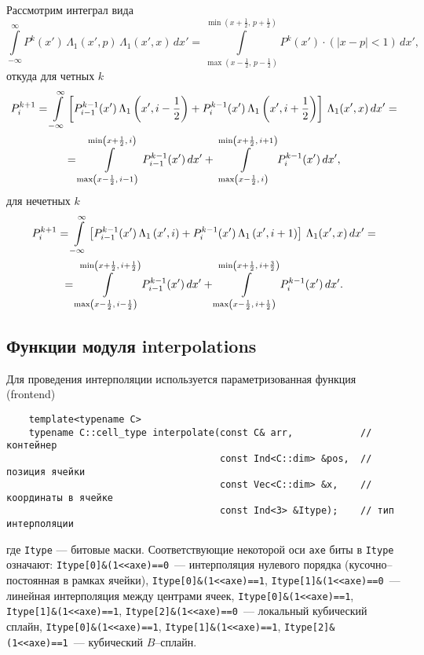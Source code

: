 Рассмотрим интеграл вида
$$
\int\limits_{-\infty}^{\infty} P^k(x')\,\Lambda_1(x', p)\,\Lambda_1(x', x)\, dx' =
\int\limits_{\max\left(x-\frac12,\,p-\frac12\right)}^{\min\left(x+\frac12,\,p+\frac12\right)} P^k(x')\cdot(|x-p|<1)\, dx', 
$$
откуда для четных $k$
\begin{multline}
  P^{k+1}_i = \int\limits_{-\infty}^{\infty} \left[
    P^{k-1}_{i-1}(x')\,\Lambda_1\left(x', i-\frac12\right) + P^{k-1}_i(x')\,\Lambda_1\left(x', i+\frac12\right)
    \right]\,\Lambda_1(x', x)\, dx' =\\=
  \int\limits_{\max\left(x-\frac12,\,i-1\right)}^{\min\left(x+\frac12,\,i\right)} P^{k-1}_{i-1}(x') \, dx' +
  \int\limits_{\max\left(x-\frac12,\,i\right)}^{\min\left(x+\frac12,\,i+1\right)} P^{k-1}_i(x') \, dx', 
  \notag
\end{multline}
для нечетных $k$
\begin{multline}
  P^{k+1}_i = \int\limits_{-\infty}^{\infty} \left[
    P^{k-1}_{i-1}(x')\,\Lambda_1\left(x', i\right) + P^{k-1}_i(x')\,\Lambda_1\left(x', i+1\right)
    \right]\,\Lambda_1(x', x)\, dx' =\\=
  \int\limits_{\max\left(x-\frac12,\,i-\frac12\right)}^{\min\left(x+\frac12,\,i+\frac12\right)} P^{k-1}_{i-1}(x') \, dx' +
  \int\limits_{\max\left(x-\frac12,\,i+\frac12\right)}^{\min\left(x+\frac12,\,i+\frac32\right)} P^{k-1}_i(x') \, dx'. 
  \notag
\end{multline}

\subsection{Функции модуля {\sf interpolations}}
Для проведения интерполяции используется параметризованная функция (frontend)
\begin{verbatim}
    template<typename C>
    typename C::cell_type interpolate(const C& arr,            // контейнер
                                      const Ind<C::dim> &pos,  // позиция ячейки
                                      const Vec<C::dim> &x,    // координаты в ячейке
                                      const Ind<3> &Itype);    // тип интерполяции
\end{verbatim}
где \verb'Itype' --- битовые маски. Соответствующие некоторой оси \verb'axe' биты в \verb'Itype' означают:
\verb'Itype[0]&(1<<axe)==0'~--- интерполяция нулевого порядка (кусочно--постоянная
в рамках ячейки), \verb'Itype[0]&(1<<axe)==1', \verb'Itype[1]&(1<<axe)==0'~--- линейная интерполяция между центрами ячеек,
\verb'Itype[0]&(1<<axe)==1', \verb'Itype[1]&(1<<axe)==1', \verb'Itype[2]&(1<<axe)==0'~--- локальный кубический сплайн,
\verb'Itype[0]&(1<<axe)==1', \verb'Itype[1]&(1<<axe)==1', \verb'Itype[2]&(1<<axe)==1'~--- кубический $B$--сплайн.




